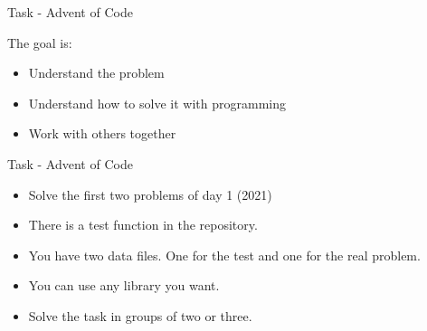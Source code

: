 \documentclass{beamer}
\begin{document}
\begin{frame}{Task - Advent of Code}
    \begin{alertblock}{The goal is:} \pause
        \begin{itemize}
            \item Understand the problem\pause
            \item Understand how to solve it with programming\pause
            \item Work with others together
        \end{itemize}
    \end{alertblock}
\end{frame}


\begin{frame}{Task - Advent of Code}
    \begin{itemize}
        \item Solve the first two problems of day 1 (2021)
        \item There is a test function in the repository.
        \item You have two data files. One for the test and one for the real problem.
        \item You can use any library you want.
        \item Solve the task in groups of two or three.
    \end{itemize}
\end{frame}
\end{document}
